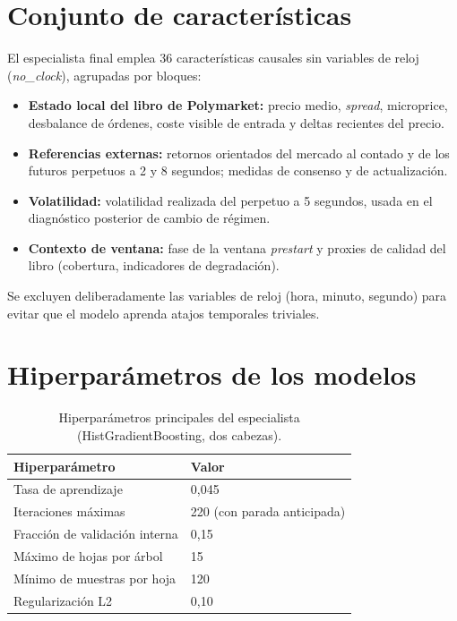 

\chapter{Conjunto de características}
\label{anexo:features}

El especialista final emplea 36 características causales sin variables de reloj
(\emph{no\_clock}), agrupadas por bloques:

\begin{itemize}[noitemsep]
\item \textbf{Estado local del libro de Polymarket:} precio medio, \emph{spread}, microprice,
desbalance de órdenes, coste visible de entrada y deltas recientes del precio.
\item \textbf{Referencias externas:} retornos orientados del mercado al contado y de los
futuros perpetuos a 2 y 8 segundos; medidas de consenso y de actualización.
\item \textbf{Volatilidad:} volatilidad realizada del perpetuo a 5 segundos, usada en el
diagnóstico posterior de cambio de régimen.
\item \textbf{Contexto de ventana:} fase de la ventana \emph{prestart} y proxies de calidad del
libro (cobertura, indicadores de degradación).
\end{itemize}

Se excluyen deliberadamente las variables de reloj (hora, minuto, segundo) para evitar que el
modelo aprenda atajos temporales triviales.

\chapter{Hiperparámetros de los modelos}
\label{anexo:hiperparametros}

\begin{table}[h]
\centering
\caption{Hiperparámetros principales del especialista (HistGradientBoosting, dos cabezas).}
\begin{tabular}{ll}
\toprule
\textbf{Hiperparámetro} & \textbf{Valor} \\
\midrule
Tasa de aprendizaje & 0,045 \\
Iteraciones máximas & 220 (con parada anticipada) \\
Fracción de validación interna & 0,15 \\
Máximo de hojas por árbol & 15 \\
Mínimo de muestras por hoja & 120 \\
Regularización L2 & 0,10 \\
\bottomrule
\end{tabular}
\end{table}

